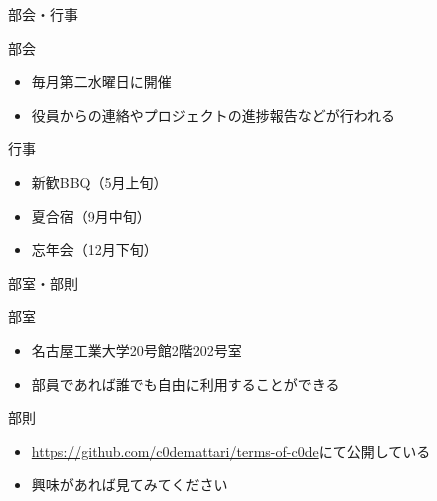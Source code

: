 \documentclass[12pt, unicode]{beamer}
\begin{document}
\begin{frame}{部会・行事}
    \begin{block}{部会}
        \begin{itemize}
            \item 毎月第二水曜日に開催
            \item 役員からの連絡やプロジェクトの進捗報告などが行われる
        \end{itemize}
    \end{block}

    \begin{block}{行事}
        \begin{itemize}
            \item 新歓BBQ（5月上旬）
            \item 夏合宿（9月中旬）
            \item 忘年会（12月下旬）
        \end{itemize}
    \end{block}
\end{frame}

\begin{frame}{部室・部則}
    \begin{block}{部室}
        \begin{itemize}
            \item 名古屋工業大学20号館2階202号室
            \item 部員であれば誰でも自由に利用することができる
        \end{itemize}
    \end{block}

    \begin{block}{部則}
        \begin{itemize}
            \item \textcolor{blue}{\url{https://github.com/c0demattari/terms-of-c0de}}にて公開している
            \item 興味があれば見てみてください
        \end{itemize}
    \end{block}
\end{frame}
\end{document}
